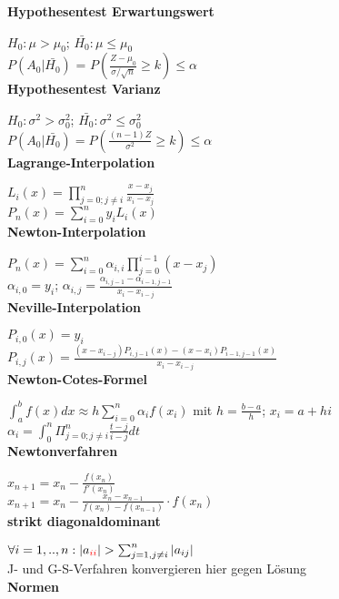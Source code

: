 \documentclass[10pt,twocolumn,a4paper]{article}
\begin{document}
\begin{flushleft}
\textbf{Hypothesentest Erwartungswert}

$H_0: \mu > \mu_0$; $\bar{H_0}: \mu \leq \mu_0$\\
$P(A_0|\bar{H_0})$ = $P(\frac{Z-\mu_0}{\sigma/\sqrt{n}} \geq k) \leq \alpha$\\

\textbf{Hypothesentest Varianz}

$H_0: \sigma^2 > \sigma_0^2$; $\bar{H_0}: \sigma^2 \leq \sigma_0^2$\\
$P(A_0|\bar{H_0}) = P(\frac{(n-1)Z}{\sigma^2} \geq k) \leq \alpha$\\

\textbf{Lagrange-Interpolation}

$L_i(x) = \prod_{j=0;j \ne i}^n \frac{x-x_j}{x_i-x_j}$\\
$P_n(x) = \sum_{i=0}^n y_i L_i(x)$\\

\textbf{Newton-Interpolation}

$P_n(x) = \sum_{i=0}^n \alpha_{i,i} \prod_{j=0}^{i-1}(x-x_j)$\\
$\alpha_{i,0} = y_i$; $\alpha_{i,j} = \frac{\alpha_{i,j-1} - \alpha_{i-1,j-1}}{x_i - x_{i-j}}$\\

\textbf{Neville-Interpolation}

$P_{i,0}(x) = y_i$\\
$P_{i,j}(x) = \frac{(x-x_{i-j})P_{i,j-1}(x) - (x-x_i)P_{i-1,j-1}(x)}{x_i - x_{i-j}}$\\

\textbf{Newton-Cotes-Formel}

$\int_a^b f(x) dx \approx h \sum_{i=0}^n \alpha_i f(x_i)$ mit $h=\frac{b-a}{h}$; $x_i = a + hi$\\
$\alpha_i = \int_0^n \Pi_{j=0;j\neq i}^n \frac{t-j}{i-j} dt$\\

\textbf{Newtonverfahren}

$x_{n+1} = x_n - \frac{f(x_n)}{f'(x_n)}$\\
$x_{n+1} = x_n - \frac{x_n - x_{n-1}}{f(x_n) - f(x_{n-1})} \cdot f(x_n)$\\

\textbf{strikt diagonaldominant}

$\forall i = 1,..,n: |a_{\textcolor{red}{ii}}| > \sum_{j=1,j\neq i}^n |a_{ij}|$\\
J- und G-S-Verfahren konvergieren hier gegen Lösung\\

\textbf{Normen}


\end{flushleft}
\end{document}
